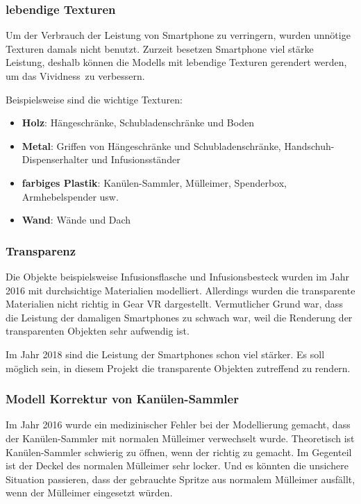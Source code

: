    \subsubsection{lebendige Texturen}
   
   Um der Verbrauch der Leistung von Smartphone zu verringern, wurden unnötige Texturen damals nicht benutzt. Zurzeit besetzen Smartphone viel stärke Leistung, deshalb können die Modells mit lebendige Texturen gerendert werden, um das \glqq Vividness\grqq\ zu verbessern.
   
   Beispielsweise sind die wichtige Texturen:
   \begin{itemize}
       \item \textbf{Holz}: Hängeschränke, Schubladenschränke und Boden
       \item \textbf{Metal}: Griffen von Hängeschränke und Schubladenschränke, Handschuh-Dispenserhalter und Infusionsständer
       \item \textbf{farbiges Plastik}: Kanülen-Sammler,  Mülleimer, Spenderbox, Armhebelspender usw.
       \item \textbf{Wand}: Wände und Dach
   \end{itemize}
   
   \subsubsection{Transparenz}
   Die Objekte beispielsweise Infusionsflasche und Infusionsbesteck wurden im Jahr 2016 mit durchsichtige Materialien modelliert. Allerdings wurden die transparente Materialien nicht richtig in Gear VR dargestellt. Vermutlicher Grund war, dass die Leistung der damaligen Smartphones zu schwach war, weil die Renderung der transparenten Objekten sehr aufwendig ist.
   
   Im Jahr 2018 sind die Leistung der Smartphones schon viel stärker. Es soll möglich sein, in diesem Projekt die transparente Objekten zutreffend zu rendern.
   
   \subsubsection{Modell Korrektur von Kanülen-Sammler}
   Im Jahr 2016 wurde ein medizinischer Fehler bei der Modellierung gemacht, dass der Kanülen-Sammler mit normalen Mülleimer verwechselt wurde. Theoretisch ist Kanülen-Sammler schwierig zu öffnen, wenn der richtig zu gemacht. Im Gegenteil ist der Deckel des normalen Mülleimer sehr locker. Und es könnten die unsichere Situation passieren, dass der gebrauchte Spritze aus normalem Mülleimer ausfällt, wenn der Mülleimer eingesetzt würden.
   
